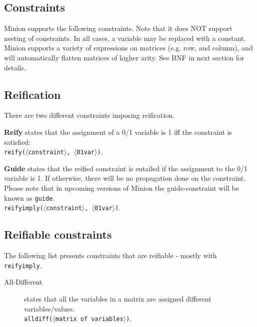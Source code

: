 \documentclass{article}
\begin{document}
\begin{small}
\section{Constraints}\label{sect_constraints}
{\sc Minion} supports the following constraints. Note that it does NOT
support nesting of constraints. In all cases, a variable may be
replaced with a constant. {\sc Minion} supports a variety of
expressions on matrices (e.g. row, and column), and will automatically
flatten matrices of higher arity. See BNF in next section for details.


\subsection{Reification}

There are two different constraints imposing reification.

\begin{description}
\item \textbf{Reify} states that the assignment of a 0/1 variable
is 1 iff the constraint is satisfied:\\
\texttt{reify($\langle$constraint$\rangle$, $\langle$01var$\rangle$)}.

\item \textbf{Guide} states that  the reified constraint is entailed if the 
assignment to the 0/1 variable is 1. If otherwise, there will be no propagation done 
on the constraint. Please note that in upcoming versions of Minion the guide-constraint will be known as 
\texttt{guide}. %
\\
\texttt{reifyimply($\langle$constraint$\rangle$, $\langle$01var$\rangle$)}.

\end{description}


\subsection{Reifiable constraints}

The following list presents constraints that are reifiable - mostly with
 \texttt{reifyimply}.  

\begin{description}
\item[All-Different] states that all the variables in a matrix are
assigned different variables/values.\\ 
\texttt{alldiff($\langle$matrix of
variables$\rangle$)}.


\end{description}
\end{small}
\end{document}
